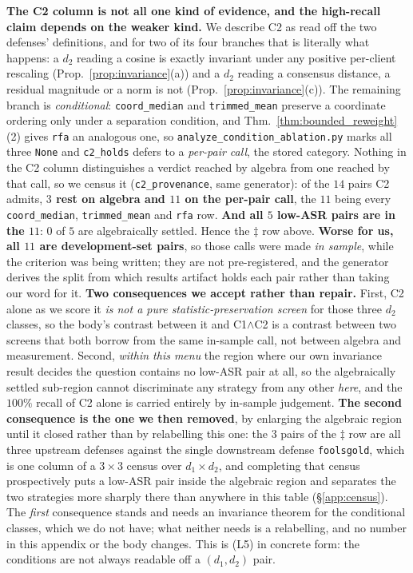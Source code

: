 \documentclass{article}
\begin{document}
\noindent \textbf{The C2 column is not all one kind of evidence, and the high-recall claim depends on
the weaker kind.} We describe C2 as read off the two defenses' definitions, and for two of its four
branches that is literally what happens: a $d_2$ reading a cosine is exactly invariant under any
positive per-client rescaling (Prop.~\ref{prop:invariance}(a)) and a $d_2$ reading a consensus
distance, a residual magnitude or a norm is not (Prop.~\ref{prop:invariance}(c)). The remaining branch
is \emph{conditional}: \texttt{coord\_median} and \texttt{trimmed\_mean} preserve a coordinate ordering
only under a separation condition, and Thm.~\ref{thm:bounded_reweight}(2) gives \texttt{rfa} an
analogous one, so \texttt{analyze\_condition\_ablation.py} marks all three \texttt{None} and
\texttt{c2\_holds} defers to a \emph{per-pair call}, the stored category. Nothing in the C2 column
distinguishes a verdict reached by algebra from one reached
by that call, so we census it (\texttt{c2\_provenance}, same generator): of the $14$ pairs C2 admits,
\textbf{$3$ rest on algebra and $11$ on the per-pair call}, the $11$ being every
\texttt{coord\_median}, \texttt{trimmed\_mean} and \texttt{rfa} row. \textbf{And all $5$ low-ASR pairs
are in the $11$}: $0$ of $5$ are algebraically settled. Hence the $\ddagger$ row above. \textbf{Worse
for us, all $11$ are development-set pairs}, so those calls were made \emph{in sample}, while the
criterion was being written; they are not pre-registered, and the generator derives the split from
which results artifact holds each pair rather than taking our word for it. \textbf{Two
consequences we accept rather than repair.} First, C2 alone as we score it \emph{is not a pure
statistic-preservation screen} for those three $d_2$ classes, so the body's contrast between it and
C1$\wedge$C2 is a contrast between two screens that both borrow from the same in-sample call, not
between algebra and measurement. Second, \emph{within this menu} the region where our own invariance
result decides the question contains no low-ASR pair at all, so the algebraically settled sub-region
cannot discriminate any strategy from any other \emph{here}, and the $100\%$ recall of C2 alone is
carried entirely by in-sample judgement. \textbf{The second consequence is the one we then removed},
by enlarging the algebraic region until it closed rather than by relabelling this one: the $3$ pairs
of the $\ddagger$ row are all three upstream defenses against the single downstream defense
\texttt{foolsgold}, which is one column of a $3\times3$ census over
$d_1 \times d_2$, and completing that census prospectively puts a
low-ASR pair inside the algebraic region and separates the two strategies more sharply there than
anywhere in this table (§\ref{app:census}). The \emph{first} consequence stands and needs an
invariance theorem for the conditional classes, which we do not have; what neither needs is a
relabelling, and no number in this appendix or the body changes. This is (L5) in concrete form: the
conditions are not always readable off a $(d_1,d_2)$ pair.
\end{document}
